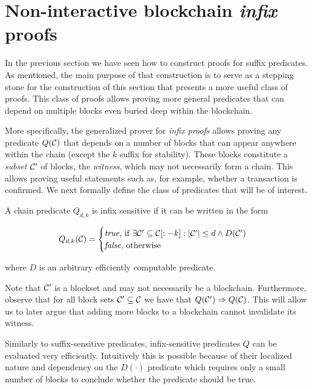 \section{Non-interactive blockchain \emph{infix} proofs}
\label{sec:infix}

In the previous section we have seen how to construct proofs for suffix
predicates. As mentioned, the main purpose of that construction is to serve as a
stepping stone for the construction of this section that presents a more useful
class of proofs. This class of proofs allows proving more general predicates
that can depend on multiple blocks even buried deep within the blockchain.

More specifically, the generalized prover for \emph{infix proofs} allows
proving any predicate $Q(\mathcal{C})$ that depends on a number of blocks that can
appear anywhere within the chain (except the $k$ suffix for stability). These
blocks constitute a \emph{subset} $\mathcal{C}'$ of blocks, the \emph{witness},
which may not necessarily form a chain. This allows proving useful statements
such as, for example, whether a transaction is confirmed. We next formally
define the class of predicates that will be of interest.

\begin{definition}
\label{def:infix}
A chain predicate $Q_{d,k}$ is \textnormal{infix sensitive} if it can be
written in the form

$$
Q_{d,k}(\mathcal{C}) =
\begin{cases}
  \text{\emph{true}, if }
    \exists \mathcal{C}' \subseteq \mathcal{C}[:-k]: |\mathcal{C}'| \leq d \land D(\mathcal{C}')\\
  \text{\emph{false}, otherwise}
\end{cases}
$$

where $D$ is an arbitrary efficiently computable predicate.
\end{definition}

Note that $\mathcal{C}'$ is a blockset and may not necessarily be a blockchain.
Furthermore, observe that for all block sets $\mathcal{C}' \subseteq \mathcal{C}$ we have
that $Q(\mathcal{C}') \Rightarrow Q(\mathcal{C})$. This will allow us to later argue that
adding more blocks to a blockchain cannot invalidate its witness.

Similarly to suffix-sensitive predicates, infix-sensitive predicates $Q$ can be
evaluated very efficiently. Intuitively this is possible because of their
localized nature and dependency on the $D(\cdot)$ predicate which requires only
a small number of blocks to conclude whether the predicate should be true.

